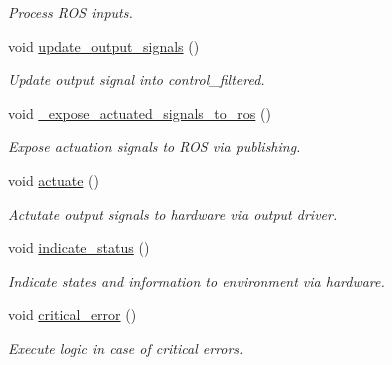\begin{DoxyCompactItemize}
\begin{DoxyCompactList}\small\item\em Process R\+OS inputs. \end{DoxyCompactList}\item 
void \hyperlink{classSPMB_1_1StateMachine_a651fcd0d71e1ce2ec7dfc72255ff8af7}{update\+\_\+output\+\_\+signals} ()\hypertarget{classSPMB_1_1StateMachine_a651fcd0d71e1ce2ec7dfc72255ff8af7}{}\label{classSPMB_1_1StateMachine_a651fcd0d71e1ce2ec7dfc72255ff8af7}

\begin{DoxyCompactList}\small\item\em Update output signal into control\+\_\+filtered. \end{DoxyCompactList}\item 
void \hyperlink{classSPMB_1_1StateMachine_a887475df9c15df2defce01f36030f931}{\+\_\+expose\+\_\+actuated\+\_\+signals\+\_\+to\+\_\+ros} ()\hypertarget{classSPMB_1_1StateMachine_a887475df9c15df2defce01f36030f931}{}\label{classSPMB_1_1StateMachine_a887475df9c15df2defce01f36030f931}

\begin{DoxyCompactList}\small\item\em Expose actuation signals to R\+OS via publishing. \end{DoxyCompactList}\item 
void \hyperlink{classSPMB_1_1StateMachine_a46d01bf4a019982fee4188d7434e38fa}{actuate} ()\hypertarget{classSPMB_1_1StateMachine_a46d01bf4a019982fee4188d7434e38fa}{}\label{classSPMB_1_1StateMachine_a46d01bf4a019982fee4188d7434e38fa}

\begin{DoxyCompactList}\small\item\em Actutate output signals to hardware via output driver. \end{DoxyCompactList}\item 
void \hyperlink{classSPMB_1_1StateMachine_afa9adcae2ee0b1d19e5c0ee53830ab4f}{indicate\+\_\+status} ()\hypertarget{classSPMB_1_1StateMachine_afa9adcae2ee0b1d19e5c0ee53830ab4f}{}\label{classSPMB_1_1StateMachine_afa9adcae2ee0b1d19e5c0ee53830ab4f}

\begin{DoxyCompactList}\small\item\em Indicate states and information to environment via hardware. \end{DoxyCompactList}\item 
void \hyperlink{classSPMB_1_1StateMachine_a8e7447f352e2a9b3f8d451bc834faaa2}{critical\+\_\+error} ()\hypertarget{classSPMB_1_1StateMachine_a8e7447f352e2a9b3f8d451bc834faaa2}{}\label{classSPMB_1_1StateMachine_a8e7447f352e2a9b3f8d451bc834faaa2}

\begin{DoxyCompactList}\small\item\em Execute logic in case of critical errors. \end{DoxyCompactList}\end{DoxyCompactItemize}
